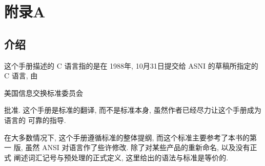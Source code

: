 
\chapter{附录A}
\section{介绍}
这个手册描述的 C 语言指的是在 1988年, 10月31日提交给 ASNI 的草稿所指定的
C 语言, 由 \begin{myquotation}美国信息交换标准委员会\end{myquotation} 批准.
这个手册是标准的翻译, 而不是标准本身, 虽然作者已经尽力让这个手册成为语言的
可靠的指导.

在大多数情况下, 这个手册遵循标准的整体提纲, 而这个标准主要参考了本书的第一
版, 虽然 ANSI 对语言作了些许修改. 除了对某些产品的重新命名, 以及没有正式
阐述词汇记号与预处理的正式定义, 这里给出的语法与标准是等价的.

